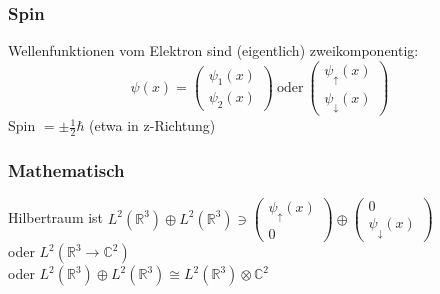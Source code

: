 \documentclass[twoside,a4paper]{scrartcl}
\renewcommand{\1}{\mathds{1}}
\newcommand{\ra}{\rightarrow}
\begin{document}
\subsubsection*{Spin}
Wellenfunktionen vom Elektron sind (eigentlich) zweikomponentig:
$$\psi(x)=\begin{pmatrix} \psi_1(x) \\ \psi_2(x)\end{pmatrix} \ \mathrm{oder} \ \begin{pmatrix} \psi_\uparrow(x) \\ \psi_\downarrow(x)\end{pmatrix}
$$
Spin $=\pm \frac{1}{2} \hbar$ (etwa in z-Richtung)

\subsubsection*{Mathematisch}
Hilbertraum ist $L^2(\mathbb R^3) \oplus L^2(\mathbb R^3) \ni \begin{pmatrix} \psi_\uparrow(x) \\ 0\end{pmatrix} \oplus \begin{pmatrix} 0 \\ \psi_\downarrow(x)\end{pmatrix}$\\
oder $L^2(\mathbb R^3 \ra \mathbb C^2)$\\
oder $L^2(\mathbb R^3) \oplus L^2(\mathbb R^3)\cong L^2(\mathbb R^3) \otimes \mathbb C^2$\\
\end{document}
